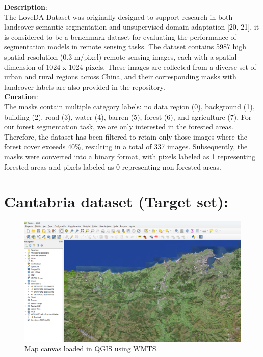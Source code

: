 \textbf{Description}: 
\\
The LoveDA Dataset was originally designed to support research in both landcover semantic segmentation and unsupervised domain adaptation [20, 21], it is considered to be a benchmark dataset for evaluating the performance of segmentation models in remote sensing tasks. The dataset contains 5987 high spatial resolution (0.3 m/pixel) remote sensing images, each with a spatial dimension of 1024 x 1024 pixels. These images are collected from a diverse set of urban and rural regions across China, and their corresponding masks with landcover labels are also provided in the repository.\\

\textbf{Curation}: 
\\
The masks contain multiple category labels: no data region (0), background (1), building (2), road (3), water (4), barren (5), forest (6), and agriculture (7). For our forest segmentation task, we are only interested in the forested areas. Therefore, the dataset has been filtered to retain only those images where the forest cover exceeds 40\%, resulting in a total of 337 images. Subsequently, the masks were converted into a binary format, with pixels labeled as 1 representing forested areas and pixels labeled as 0 representing non-forested areas. \\



\section{Cantabria dataset (Target set): }
\begin{figure}[H]
 \centering
 \includegraphics[scale=0.45]{IMAGENES/IMG14-WMTS.png}
 \captionsetup{font=large}
 \caption {Map canvas loaded in QGIS using WMTS.}
\end{figure}

